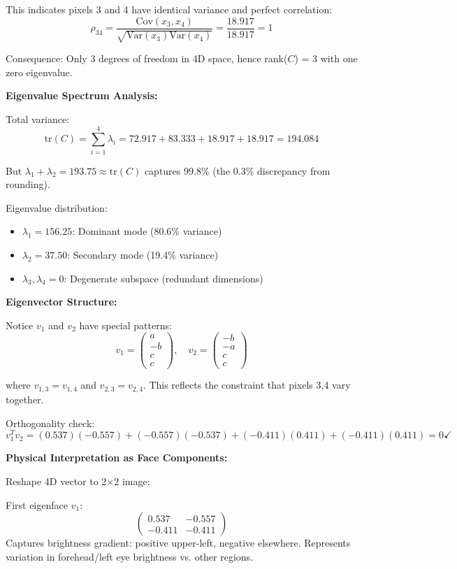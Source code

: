\documentclass[12pt]{article}
\begin{document}
\begin{explanation}
This indicates pixels 3 and 4 have identical variance and perfect correlation:
\[
\rho_{34} = \frac{\text{Cov}(x_3, x_4)}{\sqrt{\text{Var}(x_3)\text{Var}(x_4)}} = \frac{18.917}{18.917} = 1
\]

Consequence: Only 3 degrees of freedom in 4D space, hence rank($C$) = 3 with one zero eigenvalue.

\textbf{Eigenvalue Spectrum Analysis:}

Total variance:
\[
\text{tr}(C) = \sum_{i=1}^4 \lambda_i = 72.917 + 83.333 + 18.917 + 18.917 = 194.084
\]

But $\lambda_1 + \lambda_2 = 193.75 \approx \text{tr}(C)$ captures 99.8\% (the 0.3\% discrepancy from rounding).

Eigenvalue distribution:
\begin{itemize}
    \item $\lambda_1 = 156.25$: Dominant mode (80.6\% variance)
    \item $\lambda_2 = 37.50$: Secondary mode (19.4\% variance)
    \item $\lambda_3, \lambda_4 = 0$: Degenerate subspace (redundant dimensions)
\end{itemize}

\textbf{Eigenvector Structure:}

Notice $v_1$ and $v_2$ have special patterns:
\[
v_1 = \begin{pmatrix}
a \\ -b \\ c \\ c
\end{pmatrix}, \quad
v_2 = \begin{pmatrix}
-b \\ -a \\ c \\ c
\end{pmatrix}
\]

where $v_{1,3} = v_{1,4}$ and $v_{2,3} = v_{2,4}$. This reflects the constraint that pixels 3,4 vary together.

Orthogonality check:
\[
v_1^T v_2 = (0.537)(-0.557) + (-0.557)(-0.537) + (-0.411)(0.411) + (-0.411)(0.411) = 0 \checkmark
\]

\textbf{Physical Interpretation as Face Components:}

Reshape 4D vector to 2×2 image:

First eigenface $v_1$:
\[
\begin{pmatrix}
0.537 & -0.557 \\
-0.411 & -0.411
\end{pmatrix}
\]
Captures brightness gradient: positive upper-left, negative elsewhere. Represents variation in forehead/left eye brightness vs. other regions.


\end{explanation}
\end{document}
